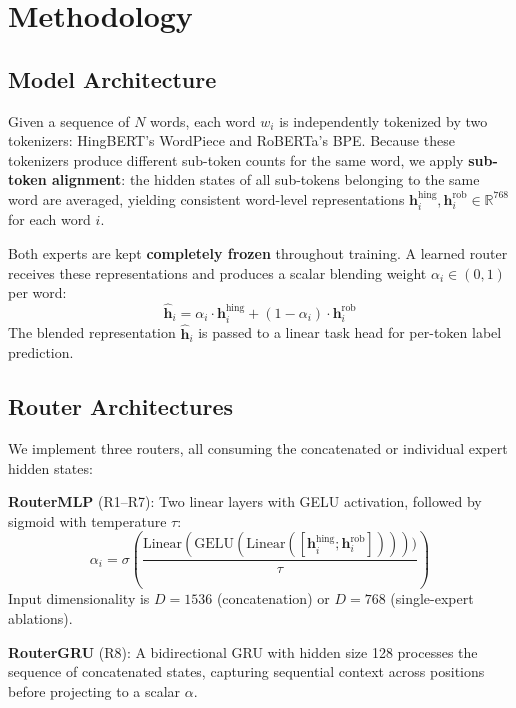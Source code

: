 \documentclass[conference]{IEEEtran}
\begin{document}
\section{Methodology}

\subsection{Model Architecture}

Given a sequence of $N$ words, each word $w_i$ is independently tokenized by two tokenizers: HingBERT's WordPiece and RoBERTa's BPE. Because these tokenizers produce different sub-token counts for the same word, we apply \textbf{sub-token alignment}: the hidden states of all sub-tokens belonging to the same word are averaged, yielding consistent word-level representations $\mathbf{h}^{\text{hing}}_i, \mathbf{h}^{\text{rob}}_i \in \mathbb{R}^{768}$ for each word $i$.

Both experts are kept \textbf{completely frozen} throughout training. A learned router receives these representations and produces a scalar blending weight $\alpha_i \in (0,1)$ per word:
\begin{equation}
    \hat{\mathbf{h}}_i = \alpha_i \cdot \mathbf{h}^{\text{hing}}_i + (1 - \alpha_i) \cdot \mathbf{h}^{\text{rob}}_i
\end{equation}
The blended representation $\hat{\mathbf{h}}_i$ is passed to a linear task head for per-token label prediction.

\subsection{Router Architectures}

We implement three routers, all consuming the concatenated or individual expert hidden states:

\textbf{RouterMLP} (R1--R7): Two linear layers with GELU activation, followed by sigmoid with temperature $\tau$:
\begin{equation}
    \alpha_i = \sigma\!\left(\frac{\text{Linear}(\text{GELU}(\text{Linear}([\mathbf{h}^{\text{hing}}_i; \mathbf{h}^{\text{rob}}_i]))))}{\tau}\right)
\end{equation}
Input dimensionality is $D=1536$ (concatenation) or $D=768$ (single-expert ablations).

\textbf{RouterGRU} (R8): A bidirectional GRU with hidden size 128 processes the sequence of concatenated states, capturing sequential context across positions before projecting to a scalar $\alpha$.
\end{document}
